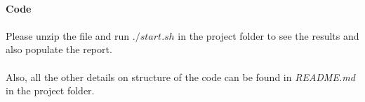 \documentclass[notitlepage]{report}
\begin{document}
	\paragraph{Code}
	\paragraph{} Please unzip the file and run $./start.sh$ in the project folder to see the results and also populate the report.
	\paragraph{} Also, all the other details on structure of the code can be found in \textit{README.md} in the project folder.
\end{document}
